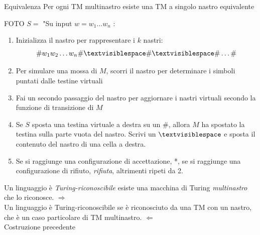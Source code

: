 \begin{theorem}{Equivalenza}
   Per ogni TM multinastro esiste una TM a singolo nastro equivalente
\end{theorem}
{\Large FOTO}
$S=$ "Su input $w = w_1\dots w_n$ :
\begin{enumerate}
   \item Inizializza il nastro per rappresentare i $k$ nastri:
      $$\#w_1w_2\dots w_n\#\textvisiblespace\#\textvisiblespace\#\dots\#$$
   \item  Per simulare una mossa di $M$, scorri il nastro per determinare i simboli puntati dalle testine virtuali
   \item  Fai un secondo passaggio del nastro per aggiornare i nastri virtuali secondo la funzione di transizione di $M$ 
   \item  Se $S$ sposta una testina virtuale a destra su un $\#$, allora $M$ ha spostato la testina sulla parte vuota del nastro. 
      Scrivi un $\textvisiblespace$ e sposta il contenuto del nastro di una cella a destra. 
   \item  Se si raggiunge una configurazione di accettazione, *, se si raggiunge una configurazione di rifiuto, \textit{rifiuta},
      altrimenti ripeti da 2.
\end{enumerate}

\begin{corollary}
   Un linguaggio è \textit{Turing-riconoscibile}  esiste una macchina di Turing \textit{multinastro} che lo riconosce. 
   $\Rightarrow$ \\
   Un linguaggio è Turing-riconoscibile se è riconosciuto da una TM con un nastro, che è un caso particolare di TM multinastro. 
   $\Leftarrow$ \\
   Costruzione precedente 
\end{corollary}

